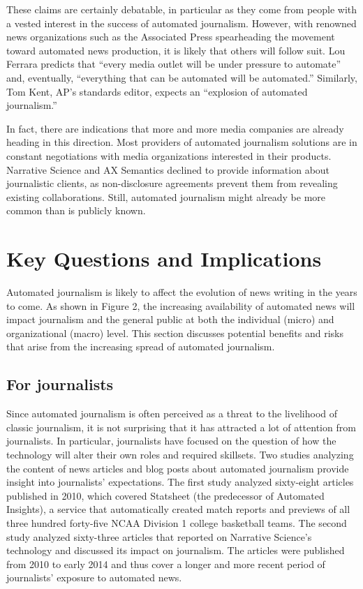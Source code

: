 \documentclass[notoc, symmetric, nobib, nols]{towcenter-book}
\begin{document}
These claims are certainly debatable, in particular as they come from people with a vested interest in the success of automated journalism. However, with renowned news organizations such as the Associated Press spearheading the movement toward automated news production, it is likely that others will follow suit. Lou Ferrara predicts that ``every media outlet will be under pressure to automate'' and, eventually, ``everything that can be automated will be automated.'' Similarly, Tom Kent, AP’s standards editor, expects an ``explosion of automated journalism.''

In fact, there are indications that more and more media companies are already heading in this direction. Most providers of automated journalism solutions are in constant negotiations with media organizations interested in their products. Narrative Science and AX Semantics declined to provide information about journalistic clients, as non-disclosure agreements prevent them from revealing existing collaborations.\cite{doerr15} Still, automated journalism might already be more common than is publicly known.
 
\chapter{Key Questions and Implications}

Automated journalism is likely to affect the evolution of news writing in the years to come. As shown in Figure 2, the increasing availability of automated news will impact journalism and the general public at both the individual (micro) and organizational (macro) level. This section discusses potential benefits and risks that arise from the increasing spread of automated journalism.

\section{For journalists}

Since automated journalism is often perceived as a threat to the livelihood of classic journalism, it is not surprising that it has attracted a lot of attention from journalists. In particular, journalists have focused on the question of how the technology will alter their own roles and required skillsets. Two studies analyzing the content of news articles and blog posts about automated journalism provide insight into journalists’ expectations. The first study analyzed sixty-eight articles published in 2010, which covered Statsheet (the predecessor of Automated Insights), a service that automatically created match reports and previews of all three hundred forty-five NCAA Division 1 college basketball teams.\cite{dalen12} The second study analyzed sixty-three articles that reported on Narrative Science’s technology and discussed its impact on journalism.\cite{carlson15} The articles were published from 2010 to early 2014 and thus cover a longer and more recent period of journalists’ exposure to automated news.
\end{document}

